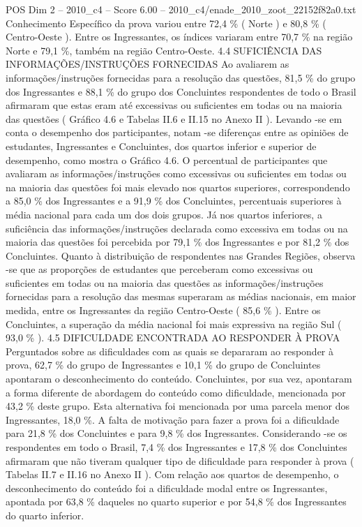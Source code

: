 \begin{textsample}{POS Dim 2 – 2010\_c4 – Score 6.00 – 2010\_c4/enade\_2010\_zoot\_22152f82a0.txt}
Conhecimento Específico da prova variou entre 72,4 \% ( Norte ) e 80,8 \% ( Centro-Oeste ).
Entre os Ingressantes, os índices variaram entre 70,7 \% na região Norte e 79,1 \%, também na região Centro-Oeste. 4.4 SUFICIÊNCIA DAS INFORMAÇÕES/INSTRUÇÕES FORNECIDAS Ao avaliarem as informações/instruções fornecidas para a resolução das questões, 81,5 \% do grupo dos Ingressantes e 88,1 \% do grupo dos Concluintes respondentes de todo o Brasil afirmaram que estas eram até excessivas ou suficientes em todas ou na maioria das questões ( Gráfico 4.6 e Tabelas II.6 e II.15 no Anexo II ).
Levando -se em conta o desempenho dos participantes, notam -se diferenças entre as opiniões de estudantes, Ingressantes e Concluintes, dos quartos inferior e superior de desempenho, como mostra o Gráfico 4.6.
O percentual de participantes que avaliaram as informações/instruções como excessivas ou suficientes em todas ou na maioria das questões foi mais elevado nos quartos superiores, correspondendo a 85,0 \% dos Ingressantes e a 91,9 \% dos Concluintes, percentuais superiores à média nacional para cada um dos dois grupos.
Já nos quartos inferiores, a suficiência das informações/instruções declarada como excessiva em todas ou na maioria das questões foi percebida por 79,1 \% dos Ingressantes e por 81,2 \% dos Concluintes.
Quanto à distribuição de respondentes nas Grandes Regiões, observa -se que as proporções de estudantes que perceberam como excessivas ou suficientes em todas ou na maioria das questões as informações/instruções fornecidas para a resolução das mesmas superaram as médias nacionais, em maior medida, entre os Ingressantes da região Centro-Oeste ( 85,6 \% ).
Entre os Concluintes, a superação da média nacional foi mais expressiva na região Sul ( 93,0 \% ). 4.5 DIFICULDADE ENCONTRADA AO RESPONDER À PROVA Perguntados sobre as dificuldades com as quais se depararam ao responder à prova, 62,7 \% do grupo de Ingressantes e 10,1 \% do grupo de Concluintes apontaram o desconhecimento do conteúdo.
Concluintes, por sua vez, apontaram a forma diferente de abordagem do conteúdo como dificuldade, mencionada por 43,2 \% deste grupo.
Esta alternativa foi mencionada por uma parcela menor dos Ingressantes, 18,0 \%.
A falta de motivação para fazer a prova foi a dificuldade para 21,8 \% dos Concluintes e para 9,8 \% dos Ingressantes.
Considerando -se os respondentes em todo o Brasil, 7,4 \% dos Ingressantes e 17,8 \% dos Concluintes afirmaram que não tiveram qualquer tipo de dificuldade para responder à prova ( Tabelas II.7 e II.16 no Anexo II ).
Com relação aos quartos de desempenho, o desconhecimento do conteúdo foi a dificuldade modal entre os Ingressantes, apontada por 63,8 \% daqueles no quarto superior e por 54,8 \% dos Ingressantes do quarto inferior.

\end{textsample}
